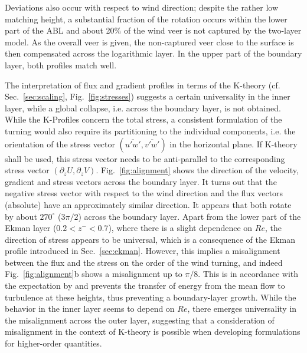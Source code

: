 \documentclass[smallcondensed,final]{svjour3}
\begin{document}
% 
Deviations also occur with respect to wind direction; despite the rather low matching height, a substantial fraction of the rotation occurs within the lower part of the ABL and about 20\% of the wind veer is not captured by the two-layer model. 
% 
As the overall veer is given, the non-captured veer close to the surface is then compensated across the logarithmic layer. In the upper part of the boundary layer, both profiles match well. 
% 
\par
% 
The interpretation of flux and gradient profiles in terms of the K-theory (cf. Sec.~\ref{sec:scaling}, Fig.~\ref{fig:stresses}) suggests a certain universality in the inner layer, while a global collapse, i.e. across the boundary layer, is not 
obtained. 
% 
While the K-Profiles concern the total stress, a consistent formulation of the turning would also require its partitioning to the individual components, i.e. the orientation of the stress vector $(\overline{u'w'}, \overline{v'w'})$ in the horizontal plane. If K-theory shall be used, this stress vector needs to be anti-parallel to the corresponding stress vector $(\partial_z U, \partial_z V)$. 
% 
Fig.~\ref{fig:alignment} shows the direction of the velocity, gradient and stress  vectors across the boundary layer. It turns out that the negative stress vector with respect to the wind direction and the flux vectors (absolute) have an approximately similar direction. 
%
It appears that both rotate by about $270^\circ$ ($3\pi/2$) across the boundary layer. 
%
Apart from the lower part of the Ekman layer ($0.2<z^-<0.7$), where there is a slight dependence on $Re$, the direction of stress appears to be universal, which is a consequence of the Ekman profile introduced in Sec.~\ref{sec:ekman}. 
%
However, this implies a misalignment between the flux and the stress on the order of the wind turning, and indeed Fig.~\ref{fig:alignment}b shows a misalignment up to $\pi/8$. This is in accordance with the expectation by \cite[][Chap.~7.18]{Townsend:1976} and prevents the transfer of energy from the mean flow to turbulence at these heights, thus preventing a boundary-layer growth. 
% 
While the behavior in the inner layer seems to depend on $Re$, there emerges universality in the misalignment across the outer layer, suggesting that a consideration of misalignment in the context of K-theory is possible when developing formulations for higher-order quantities. 
%
\end{document}
